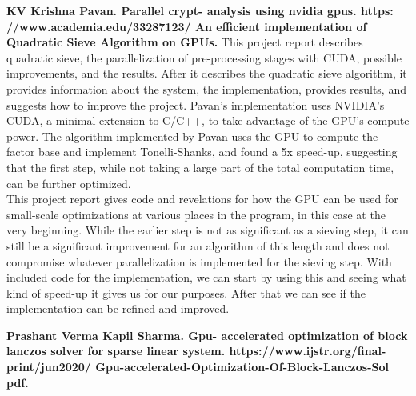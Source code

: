 \documentclass[11pt,twocolumn]{article}
\begin{document}
\textbf{KV Krishna Pavan.
Parallel crypt-
analysis using nvidia gpus.
https:
//www.academia.edu/33287123/
An efficient implementation of
Quadratic Sieve Algorithm on GPUs.}
This project report describes quadratic sieve, the parallelization of pre-processing stages with CUDA, possible improvements, and the results. After it describes the quadratic sieve algorithm, it provides information about the system, the implementation, provides results, and suggests how to improve the project. Pavan's implementation uses NVIDIA's CUDA, a minimal extension to C/C++, to take advantage of the GPU's compute power. The algorithm implemented by Pavan uses the GPU to compute the factor base and implement Tonelli-Shanks, and found a 5x speed-up, suggesting that the first step, while not taking a large part of the total computation time, can be further optimized. \\
\indent This project report gives code and revelations for how the GPU can be used for small-scale optimizations at various places in the program, in this case at the very beginning. While the earlier step is not as significant as a sieving step, it can still be a significant improvement for an algorithm of this length and does not compromise whatever parallelization is implemented for the sieving step. With included code for the implementation, we can start by using this and seeing what kind of speed-up it gives us for our purposes. After that we can see if the implementation can be refined and improved.

\textbf{Prashant Verma Kapil Sharma.
Gpu-
accelerated optimization of block lanczos
solver for sparse linear system. https://www.ijstr.org/final-print/jun2020/
Gpu-accelerated-Optimization-Of-Block-Lanczos-Sol
pdf.}
\end{document}
